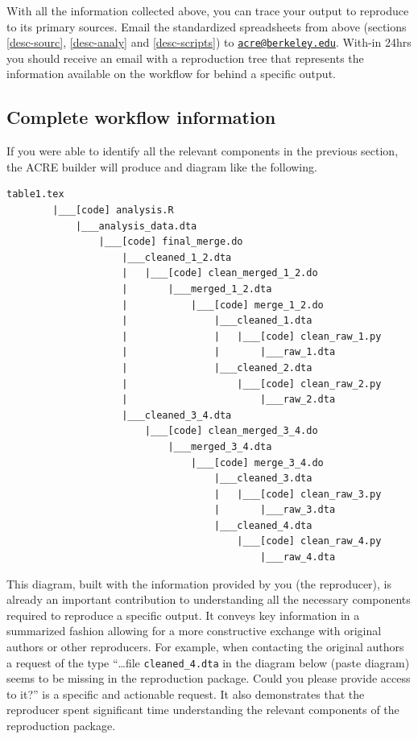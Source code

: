 \documentclass[]{book}
\begin{document}
With all the information collected above, you can trace your output to reproduce to its primary sources. Email the standardized spreadsheets from above (sections \ref{desc-sourc}, \ref{desc-analy} and \ref{desc-scripts}) to \href{mailto:acre@berkeley.edu}{\nolinkurl{acre@berkeley.edu}}. With-in 24hrs you should receive an email with a reproduction tree that represents the information available on the workflow for behind a specific output.

\hypertarget{complete-workflow-information}{%
\subsection{Complete workflow information}\label{complete-workflow-information}}

If you were able to identify all the relevant components in the previous section, the ACRE builder will produce and diagram like the following.

\begin{verbatim}
table1.tex
        |___[code] analysis.R
            |___analysis_data.dta
                |___[code] final_merge.do
                    |___cleaned_1_2.dta
                    |   |___[code] clean_merged_1_2.do
                    |       |___merged_1_2.dta
                    |           |___[code] merge_1_2.do
                    |               |___cleaned_1.dta
                    |               |   |___[code] clean_raw_1.py
                    |               |       |___raw_1.dta
                    |               |___cleaned_2.dta
                    |                   |___[code] clean_raw_2.py
                    |                       |___raw_2.dta
                    |___cleaned_3_4.dta
                        |___[code] clean_merged_3_4.do
                            |___merged_3_4.dta
                                |___[code] merge_3_4.do
                                    |___cleaned_3.dta
                                    |   |___[code] clean_raw_3.py
                                    |       |___raw_3.dta
                                    |___cleaned_4.dta
                                        |___[code] clean_raw_4.py
                                            |___raw_4.dta
\end{verbatim}

This diagram, built with the information provided by you (the reproducer), is already an important contribution to understanding all the necessary components required to reproduce a specific output. It conveys key information in a summarized fashion allowing for a more constructive exchange with original authors or other reproducers. For example, when contacting the original authors a request of the type ``\ldots{}file \texttt{cleaned\_4.dta} in the diagram below (paste diagram) seems to be missing in the reproduction package. Could you please provide access to it?'' is a specific and actionable request. It also demonstrates that the reproducer spent significant time understanding the relevant components of the reproduction package.
\end{document}
